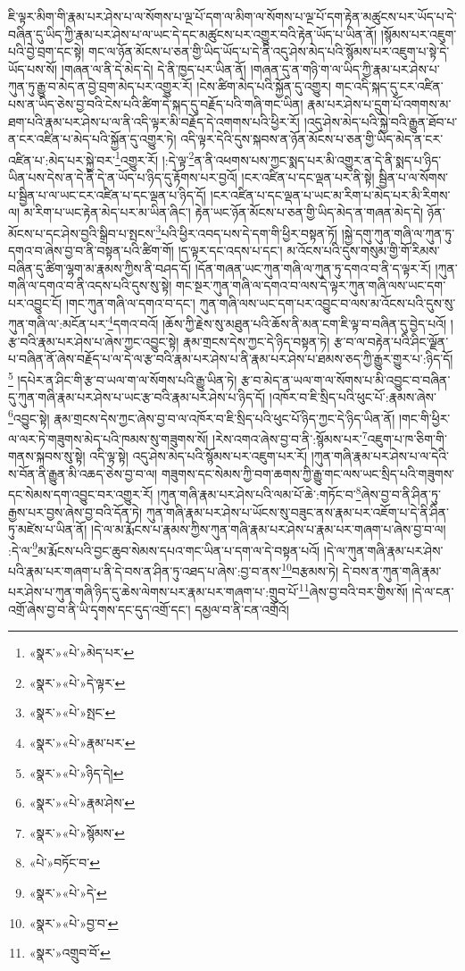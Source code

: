 ཇི་ལྟར་མིག་གི་རྣམ་པར་ཤེས་པ་ལ་སོགས་པ་ལྔ་པོ་དག་ལ་མིག་ལ་སོགས་པ་ལྔ་པོ་དག་རྟེན་མཚུངས་པར་ཡོད་པ་དེ་བཞིན་དུ་ཡིད་ཀྱི་རྣམ་པར་ཤེས་པ་ལ་ཡང་དེ་དང་མཚུངས་པར་འགྱུར་བའི་རྟེན་ཡོད་པ་ཡིན་ནོ། །སྙོམས་པར་འཇུག་པའི་བྱེ་བྲག་དང་སྟེ། གང་ལ་ཉོན་མོངས་པ་ཅན་གྱི་ཡིད་ཡོད་པ་དེ་ནི་འདུ་ཤེས་མེད་པའི་སྙོམས་པར་འཇུག་པ་སྟེ་དེ་ཡོད་པས་སོ། །གཞན་ལ་ནི་དེ་མེད་དེ། དེ་ནི་ཁྱད་པར་ཡིན་ནོ། །གཞན་དུ་ན་གཉི་ག་ལ་ཡིད་ཀྱི་རྣམ་པར་ཤེས་པ་ཀུན་ཏུ་རྒྱུ་བ་མེད་ན་བྱེ་བྲག་མེད་པར་འགྱུར་རོ། །ངེས་ཚིག་མེད་པའི་སྐྱོན་དུ་འགྱུར། གང་འདི་སྐད་དུ་ངར་འཛིན་པས་ན་ཡིད་ཅེས་བྱ་བའི་ངེས་པའི་ཚིག་དེ་སྐད་དུ་བརྗོད་པའི་གཞི་གང་ཡིན། རྣམ་པར་ཤེས་པ་དྲུག་པོ་འགགས་མ་ཐག་པའི་རྣམ་པར་ཤེས་པ་ལ་ནི་འདི་ལྟར་མི་བརྗོད་དེ་འགགས་པའི་ཕྱིར་རོ། །འདུ་ཤེས་མེད་པའི་སྐྱེ་བའི་རྒྱུན་ཐོབ་པ་ན་ངར་འཛིན་པ་མེད་པའི་སྐྱོན་དུ་འགྱུར་ཏེ། འདི་ལྟར་དེའི་དུས་སྐབས་ན་ཉོན་མོངས་པ་ཅན་གྱི་ཡིད་མེད་ན་ངར་འཛིན་པ་:མེད་པར་སྐྱེ་བར་\footnote{«སྣར་»«པེ་»མེད་པར་}འགྱུར་རོ། །:དེ་ལྟ་\footnote{«སྣར་»«པེ་»དེ་ལྟར་}ན་ནི་འཕགས་པས་ཀྱང་སྨད་པར་མི་འགྱུར་ན་དེ་ནི་སྨད་པ་ཉིད་ཡིན་པས་དེས་ན་དེ་ནི་དེ་ན་ཡོད་པ་ཉིད་དུ་རྟོགས་པར་བྱའོ། །ངར་འཛིན་པ་དང་ལྡན་པར་ནི་སྟེ། སྦྱིན་པ་ལ་སོགས་པ་སྦྱིན་པ་ལ་ཡང་ངར་འཛིན་པ་དང་ལྡན་པ་ཉིད་དོ། །ངར་འཛིན་པ་དང་ལྡན་པ་ཡང་མ་རིག་པ་མེད་པར་མི་རིགས་ལ། མ་རིག་པ་ཡང་རྟེན་མེད་པར་མ་ཡིན་ཞིང་། རྟེན་ཡང་ཉོན་མོངས་པ་ཅན་གྱི་ཡིད་མེད་ན་གཞན་མེད་དེ། ཉོན་མོངས་པ་དང་ཤེས་བྱའི་སྒྲིབ་པ་སྤངས་\footnote{«སྣར་»«པེ་»སྤང་}པའི་ཕྱིར་འབད་པས་དེ་དག་གི་ཕྱིར་བསྟན་ཏོ། །སྐྱེ་དགུ་ཀུན་གཞི་ལ་ཀུན་ཏུ་དགའ་བ་ཞེས་བྱ་བ་ནི་བསྟན་པའི་ཚིག་གོ། །ད་ལྟར་དང་འདས་པ་དང་། མ་འོངས་པའི་དུས་གསུམ་གྱི་གོ་རིམས་བཞིན་དུ་ཚིག་ལྷག་མ་རྣམས་ཀྱིས་ནི་བཤད་དོ། །དོན་གཞན་ཡང་ཀུན་གཞི་ལ་ཀུན་ཏུ་དགའ་བ་ནི་ད་ལྟར་རོ། །ཀུན་གཞི་ལ་དགའ་བ་ནི་འདས་པའི་དུས་སུ་སྟེ། གང་སྔར་ཀུན་གཞི་ལ་དགའ་བ་ལས་དེ་ལྟར་ཀུན་གཞི་ལས་ཡང་དག་པར་འབྱུང་ངོ། །གང་ཀུན་གཞི་ལ་དགའ་བ་དང་། ཀུན་གཞི་ལས་ཡང་དག་པར་འབྱུང་བ་ལས་མ་འོངས་པའི་དུས་སུ་ཀུན་གཞི་ལ་:མངོན་པར་\footnote{«སྣར་»«པེ་»རྣམ་པར་}དགའ་བའོ། །ཆོས་ཀྱི་རྗེས་སུ་མཐུན་པའི་ཆོས་ནི་མན་ངག་ཇི་ལྟ་བ་བཞིན་དུ་བྱེད་པའོ། །རྩ་བའི་རྣམ་པར་ཤེས་པ་ཞེས་ཀྱང་འབྱུང་སྟེ། རྣམ་གྲངས་དེས་ཀྱང་དེ་ཉིད་བསྟན་ཏེ། རྩ་བ་ལ་བརྟེན་པའི་ཤིང་ལྗོན་པ་བཞིན་ནོ་ཞེས་བརྗོད་པ་ལ་དེ་ལ་རྩ་བའི་རྣམ་པར་ཤེས་པ་ནི་རྣམ་པར་ཤེས་པ་ཐམས་ཅད་ཀྱི་རྒྱུར་གྱུར་པ་:ཉིད་དོ།\footnote{«སྣར་»«པེ་»ཉིད་དེ།} །དཔེར་ན་ཤིང་གི་རྩ་བ་ཡལ་ག་ལ་སོགས་པའི་རྒྱུ་ཡིན་ཏེ། རྩ་བ་མེད་ན་ཡལ་ག་ལ་སོགས་པ་མི་འབྱུང་བ་བཞིན་དུ་ཀུན་གཞི་རྣམ་པར་ཤེས་པ་ཡང་རྩ་བའི་རྣམ་པར་ཤེས་པ་ཉིད་དོ། །འཁོར་བ་ཇི་སྲིད་པའི་ཕུང་པོ་:རྣམས་ཞེས་\footnote{«སྣར་»«པེ་»རྣམ་ཤེས་}འབྱུང་སྟེ། རྣམ་གྲངས་དེས་ཀྱང་ཞེས་བྱ་བ་ལ་འཁོར་བ་ཇི་སྲིད་པའི་ཕུང་པོ་ཉིད་ཀྱང་དེ་ཉིད་ཡིན་ནོ། །གང་གི་ཕྱིར་ལ་ལར་ཏེ་གཟུགས་མེད་པའི་ཁམས་སུ་གཟུགས་སོ། །རེས་འགའ་ཞེས་བྱ་བ་ནི་:སྙོམས་པར་\footnote{«སྣར་»«པེ་»སྙོམས་}འཇུག་པ་ཁ་ཅིག་གི་གནས་སྐབས་སུ་སྟེ། འདི་ལྟ་སྟེ། འདུ་ཤེས་མེད་པའི་སྙོམས་པར་འཇུག་པར་རོ། །ཀུན་གཞི་རྣམ་པར་ཤེས་པ་ལ་དེའི་ས་བོན་ནི་རྒྱུན་མི་འཆད་ཅེས་བྱ་བ་ལ། གཟུགས་དང་སེམས་ཀྱི་བག་ཆགས་ཀྱི་རྒྱུ་གང་ལས་ཡང་སྲིད་པའི་གཟུགས་དང་སེམས་དག་འབྱུང་བར་འགྱུར་རོ། །ཀུན་གཞི་རྣམ་པར་ཤེས་པའི་ལམ་པོ་ཆེ་:གཏོང་བ་\footnote{«པེ་»བཏོང་བ་}ཞེས་བྱ་བ་ནི་ཤིན་ཏུ་རྒྱས་པར་བྱས་ཞེས་བྱ་བའི་དོན་ཏེ། ཀུན་གཞི་རྣམ་པར་ཤེས་པ་ཡོངས་སུ་བཟུང་ནས་རྣམ་པར་འཇོག་པ་དེ་ནི་ཤིན་ཏུ་མཛེས་པ་ཡིན་ནོ། །དེ་ལ་མ་རྨོངས་པ་རྣམས་ཀྱིས་ཀུན་གཞི་རྣམ་པར་ཤེས་པ་རྣམ་པར་གཞག་པ་ཞེས་བྱ་བ་ལ། :དེ་ལ་\footnote{«སྣར་»«པེ་»དེ་}མ་རྨོངས་པའི་བྱང་ཆུབ་སེམས་དཔའ་གང་ཡིན་པ་དག་ལ་དེ་བསྟན་པའོ། །དེ་ལ་ཀུན་གཞི་རྣམ་པར་ཤེས་པའི་རྣམ་པར་གཞག་པ་ནི་དེ་བས་ན་ཤིན་ཏུ་འཐད་པ་ཞེས་:བྱ་བ་ནས་\footnote{«སྣར་»«པེ་»བྱ་བ་}བརྩམས་ཏེ། དེ་བས་ན་ཀུན་གཞི་རྣམ་པར་ཤེས་པ་ཀུན་གཞི་ཉིད་དུ་ཆེས་ལེགས་པར་རྣམ་པར་གཞག་པ་:གྲུབ་པོ་\footnote{«སྣར་»འགྲུབ་བོ་}ཞེས་བྱ་བའི་བར་གྱིས་སོ། །དེ་ལ་ངན་འགྲོ་ཞེས་བྱ་བ་ནི་ཡི་དྭགས་དང་དུད་འགྲོ་དང་། དམྱལ་བ་ནི་ངན་འགྲོའོ། 